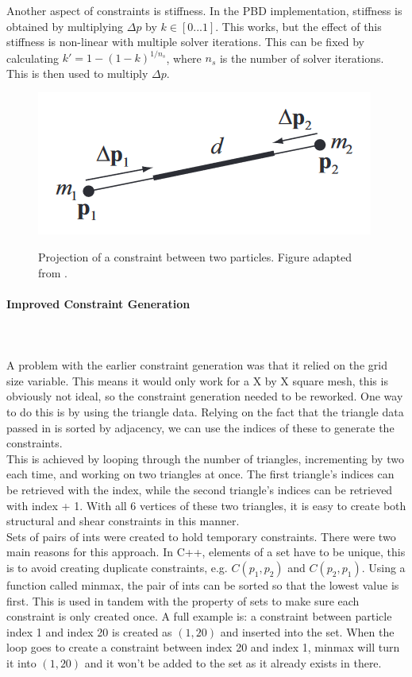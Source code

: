 \documentclass[12pt,a4paper]{article}
\begin{document}
Another aspect of constraints is stiffness. In the PBD implementation, stiffness is obtained by multiplying ${\Delta}p$ by $k\in[0...1]$. This works, but the effect of this stiffness is non-linear with multiple solver iterations. This can be fixed by calculating $k'=1-(1-k)^{1/n_s}$, where $n_s$ is the number of solver iterations. This is then used to multiply ${\Delta}p$.
\begin{figure}
	\centering
	\caption{Projection of a constraint between two particles. Figure adapted from \protect\cite{muller2007position}.}
	\includegraphics[scale=0.5]{constraint.png}
	\label{fig:conproj}
\end{figure}
\paragraph{Improved Constraint Generation}\mbox{} \\ \\	
A problem with the earlier constraint generation was that it relied on the grid size variable. This means it would only work for a X by X square mesh, this is obviously not ideal, so the constraint generation needed to be reworked. One way to do this is by using the triangle data. Relying on the fact that the triangle data passed in is sorted by adjacency, we can use the indices of these to generate the constraints. \\

This is achieved by looping through the number of triangles, incrementing by two each time, and working on two triangles at once. The first triangle's indices can be retrieved with the index, while the second triangle's indices can be retrieved with index + 1. With all 6 vertices of these two triangles, it is easy to create both structural and shear constraints in this manner. \\

Sets of pairs of ints were created to hold temporary constraints. There were two main reasons for this approach. In C++, elements of a set have to be unique, this is to avoid creating duplicate constraints, e.g. $C(p_1,p_2)$ and $C(p_2,p_1)$. Using a function called minmax, the pair of ints can be sorted so that the lowest value is first. This is used in tandem with the property of sets to make sure each constraint is only created once. A full example is: a constraint between particle index 1 and index 20 is created as $(1,20)$ and inserted into the set. When the loop goes to create a constraint between index 20 and index 1, minmax will turn it into $(1,20)$ and it won't be added to the set as it already exists in there. \\
\end{document}
